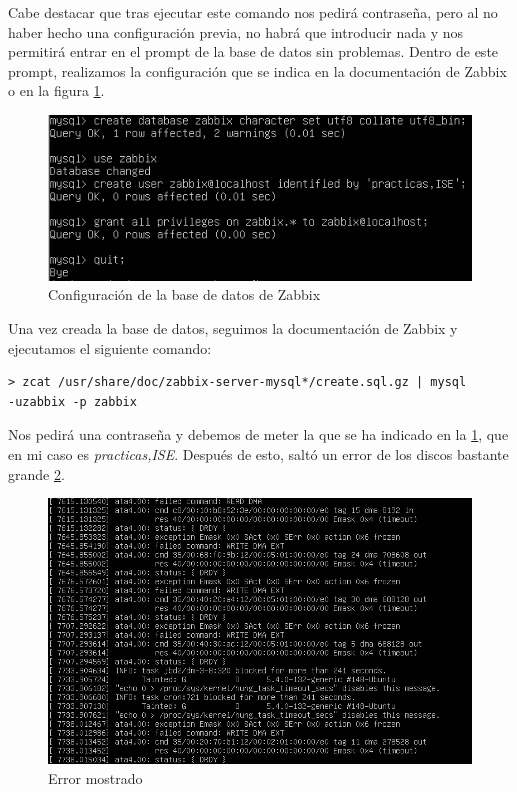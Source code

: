 Cabe destacar que tras ejecutar este comando nos pedirá contraseña, pero al no haber hecho una configuración previa, no habrá que introducir nada y nos permitirá entrar en el prompt de la base de datos sin problemas. Dentro de este prompt, realizamos la configuración que se indica en la documentación de Zabbix o en la figura \ref{fig:mysql}.

\begin{figure}[H]
  \centering
  \includegraphics{Captura3}
  \caption{Configuración de la base de datos de Zabbix}
  \label{fig:mysql}
\end{figure}

Una vez creada la base de datos, seguimos la documentación de Zabbix y ejecutamos el siguiente comando:\\

\begin{lstlisting}
> zcat /usr/share/doc/zabbix-server-mysql*/create.sql.gz | mysql
-uzabbix -p zabbix
\end{lstlisting}

Nos pedirá una contraseña y debemos de meter la que se ha indicado en la \ref{fig:mysql}, que en mi caso es \textit{practicas,ISE}. Después de esto, saltó un error de los discos bastante grande \ref{fig:error}.

\begin{figure}[H]
  \centering
  \includegraphics[scale=0.9]{error}
  \caption{Error mostrado}
  \label{fig:error}
\end{figure}

